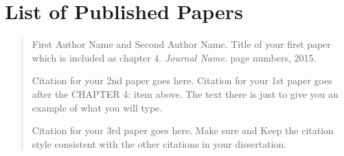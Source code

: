 \chapter*{List of Published Papers}

\singlespacing
\begin{quote}
\begin{description}[leftmargin=!,labelwidth=\widthof{\bfseries CHAPTER 4:}]
    \item[CHAPTER 4:] First Author Name and Second Author Name. Title of your
        first paper which is included as chapter 4. \textit{Journal Name}. page
        numbers, 2015.
    \item[CHAPTER 5:] Citation for your 2nd paper goes here. Citation for your
        1st paper goes after the CHAPTER 4: item above. The text there is just
        to give you an example of what you will type.
    \item[CHAPTER 6:] Citation for your 3rd paper goes here. Make sure and
        Keep the citation style consistent with the other citations in your
        dissertation.
\end{description}
\end{quote}
\doublespacing
